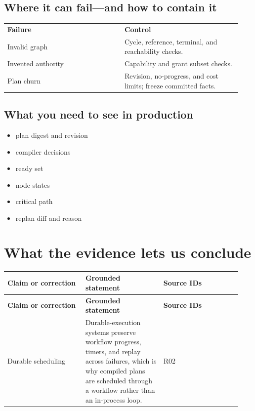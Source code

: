 \subsection{Where it can fail—and how to contain it}

\BookTableStart
\small
\begin{tabular}{@{}Y{0.4700\linewidth}Y{0.4700\linewidth}@{}}
\color{white}\bfseries \textbf{Failure} & \color{white}\bfseries \textbf{Control} \\
Invalid graph & Cycle, reference, terminal, and reachability checks. \\
Invented authority & Capability and grant subset checks. \\
Plan churn & Revision, no-progress, and cost limits; freeze committed facts. \\
\end{tabular}
\BookTableEnd

\subsection{What you need to see in production}

\begin{itemize}

\item plan digest and revision

\item compiler decisions

\item ready set

\item node states

\item critical path

\item replan diff and reason

\end{itemize}

\section{What the evidence lets us conclude}

\BookTableStart
\small
\begin{longtable}{@{}Y{0.3133\linewidth}Y{0.3133\linewidth}Y{0.3133\linewidth}@{}}
\color{white}\bfseries \textbf{Claim or correction} & \color{white}\bfseries \textbf{Grounded statement} & \color{white}\bfseries \textbf{Source IDs} \\
\endfirsthead
{}
\color{white}\bfseries \textbf{Claim or correction} & \color{white}\bfseries \textbf{Grounded statement} & \color{white}\bfseries \textbf{Source IDs} \\
\endhead
Durable scheduling & Durable-execution systems preserve workflow progress, timers, and replay across failures, which is why compiled plans are scheduled through a workflow rather than an in-process loop. & R02 \\
\end{longtable}
\BookTableEnd

